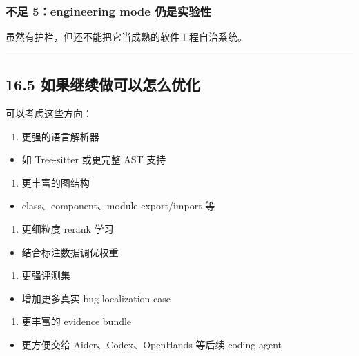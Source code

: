 \documentclass[UTF8,12pt,openany]{ctexbook}
\begin{document}
\subsubsection{不足 5：engineering mode 仍是实验性}

虽然有护栏，但还不能把它当成熟的软件工程自治系统。\par

\hrule

\subsection{16.5 如果继续做可以怎么优化}

可以考虑这些方向：\par

\begin{enumerate}
\item 更强的语言解析器
\end{enumerate}
\begin{itemize}
\item 如 Tree-sitter 或更完整 AST 支持
\end{itemize}

\begin{enumerate}
\item 更丰富的图结构
\end{enumerate}
\begin{itemize}
\item class、component、module export/import 等
\end{itemize}

\begin{enumerate}
\item 更细粒度 rerank 学习
\end{enumerate}
\begin{itemize}
\item 结合标注数据调优权重
\end{itemize}

\begin{enumerate}
\item 更强评测集
\end{enumerate}
\begin{itemize}
\item 增加更多真实 bug localization case
\end{itemize}

\begin{enumerate}
\item 更丰富的 evidence bundle
\end{enumerate}
\begin{itemize}
\item 更方便交给 Aider、Codex、OpenHands 等后续 coding agent
\end{itemize}
\end{document}
